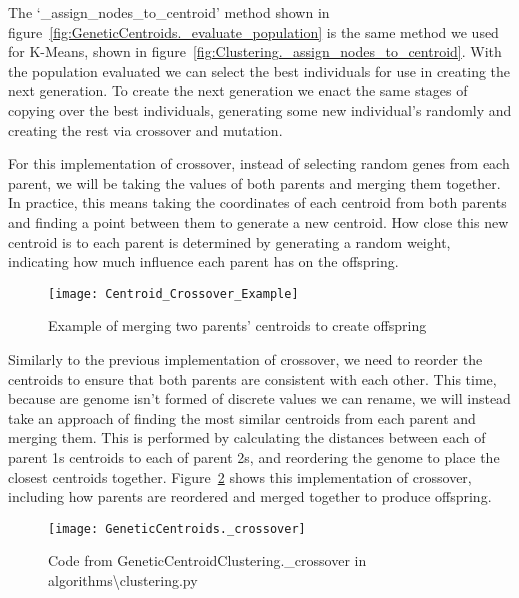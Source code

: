 \noindent
The `\_assign\_nodes\_to\_centroid' method shown in figure~\ref{fig:GeneticCentroids._evaluate_population} is the same
method we used for K-Means, shown in figure~\ref{fig:Clustering._assign_nodes_to_centroid}.
With the population evaluated we can select the best individuals for use in creating the next generation.
To create the next generation we enact the same stages of copying over the best individuals, generating some new
individual's randomly and creating the rest via crossover and mutation.

For this implementation of crossover, instead of selecting random genes from each parent, we will be taking the
values of both parents and merging them together.
In practice, this means taking the coordinates of each centroid from both parents and finding a point between them
to generate a new centroid.
How close this new centroid is to each parent is determined by generating a random weight, indicating how much
influence each parent has on the offspring.
\begin{figure}[H]
    \centering
    \texttt{[image: Centroid\_Crossover\_Example]}
    \caption{Example of merging two parents' centroids to create offspring}
    \label{Centroid_Crossover_Example}
\end{figure}

\noindent
Similarly to the previous implementation of crossover, we need to reorder the centroids to ensure that both parents
are consistent with each other.
This time, because are genome isn't formed of discrete values we can rename, we will instead take an approach of
finding the most similar centroids from each parent and merging them.
This is performed by calculating the distances between each of parent 1s centroids to each of parent 2s, and
reordering the genome to place the closest centroids together.
Figure~\ref{fig:GeneticCentroids._crossover} shows this implementation of crossover, including how parents are
reordered and merged together to produce offspring.
\begin{figure}[H]
    \centering
    \texttt{[image: GeneticCentroids.\_crossover]}
    \caption{Code from GeneticCentroidClustering.\_crossover in algorithms\textbackslash clustering.py}
    \label{fig:GeneticCentroids._crossover}
\end{figure}

